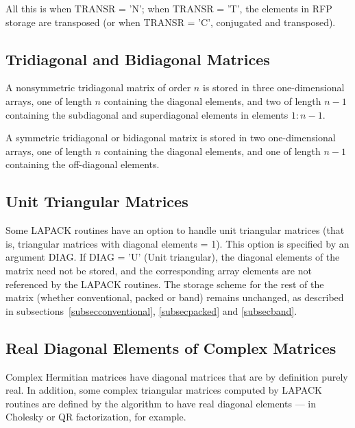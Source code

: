 All this is when TRANSR = 'N'; when TRANSR = 'T', the elements in RFP storage
are transposed (or when TRANSR = 'C', conjugated and transposed).


\subsection{Tridiagonal and Bidiagonal Matrices}\label{subsectribi} 

A nonsymmetric 
tridiagonal matrix of order $n$ is stored in
three one-dimensional arrays, one of length $n$ containing the
diagonal elements, and two of length $n-1$ containing the
subdiagonal and superdiagonal elements in elements $1:n-1$.

A symmetric tridiagonal or 
bidiagonal  matrix is stored in
two one-dimensional arrays, one of length $n$ containing the
diagonal elements, and one of length $n-1$ containing the
off-diagonal elements.

\subsection{Unit Triangular Matrices}\label{subsecunittri}

Some LAPACK routines have an option to handle unit triangular matrices
(that is, triangular matrices with diagonal elements = 1). This option
is specified by an argument DIAG. If DIAG = 'U' (Unit triangular),
the diagonal elements of the matrix need not be stored, and the
corresponding array elements are not referenced by the LAPACK routines.
The storage scheme for the rest of the matrix (whether conventional, 
packed or band) remains unchanged, as described in 
subsections~\ref{subsecconventional}, \ref{subsecpacked} and
\ref{subsecband}.

\subsection{Real Diagonal Elements of Complex Matrices}\label{subsecrealdiag}

Complex Hermitian matrices 
have diagonal matrices that are by definition
purely real. In addition, some complex triangular matrices computed by
LAPACK routines are defined by the algorithm to have real diagonal elements
--- in Cholesky or QR factorization, for example.

